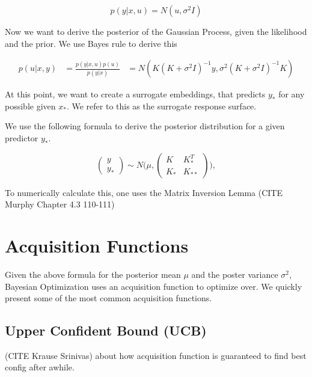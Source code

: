 \documentclass[a4paper,12pt,twoside,openright]{report}
\begin{document}
\begin{equation}
p(y | x, u) = N (u, \sigma^2 I)
\end{equation}


Now we want to derive the posterior of the Gaussian Process, given the likelihood and the prior.
We use Bayes rule to derive this

\begin{align}
p(u | x, y) &= \frac{ p(y | x, u) p(u) }{p(y | x)}
& = N( K(K +\sigma^2 I)^{-1}y, \sigma^2 (K + \sigma^2 I)^{-1} K )
\end{align}

At this point, we want to create a surrogate embeddings, that predicts $y_*$ for any possible given $x_*$. 
We refer to this as the surrogate response surface.

We use the following formula to derive the posterior distribution for a given predictor $y_*$.

\begin{equation}
\begin{pmatrix} y \\
y_* \end{pmatrix} \sim N\Biggl(\mu,\begin{pmatrix} K & K^T_*\\
 K_* & K_{**} \end{pmatrix}\Biggr),
\end{equation}

To numerically calculate this, one uses the Matrix Inversion Lemma (CITE Murphy Chapter 4.3 110-111)


\section{Acquisition Functions}

Given the above formula for the posterior mean $\mu$ and the poster variance $\sigma^2$, Bayesian Optimization uses an acquisition function to optimize over.
We quickly present some of the most common acquisition functions.


\subsection{Upper Confident Bound (UCB)}
(CITE Krause Srinivas) about how acquisition function is guaranteed to find best config after awhile.
\end{document}
